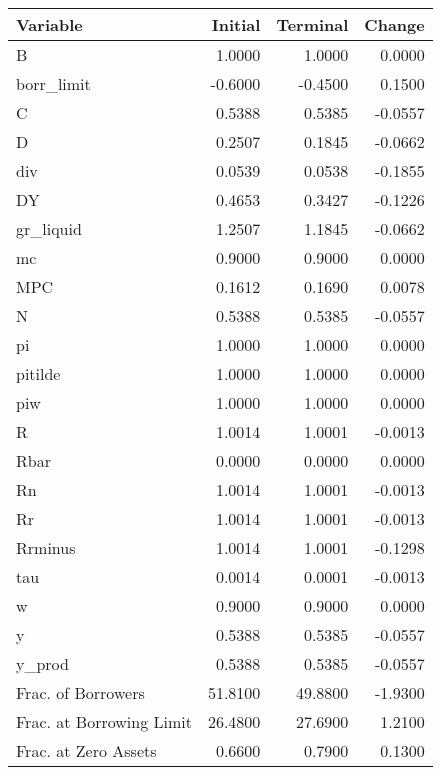 \begin{table}
\centering
\label{tab:stst}
\begin{tabular}{lrrr}
\toprule
                Variable &  Initial &  Terminal &  Change \\
\midrule
                       B &   1.0000 &    1.0000 &  0.0000 \\
              borr\_limit &  -0.6000 &   -0.4500 &  0.1500 \\
                       C &   0.5388 &    0.5385 & -0.0557 \\
                       D &   0.2507 &    0.1845 & -0.0662 \\
                     div &   0.0539 &    0.0538 & -0.1855 \\
                      DY &   0.4653 &    0.3427 & -0.1226 \\
               gr\_liquid &   1.2507 &    1.1845 & -0.0662 \\
                      mc &   0.9000 &    0.9000 &  0.0000 \\
                     MPC &   0.1612 &    0.1690 &  0.0078 \\
                       N &   0.5388 &    0.5385 & -0.0557 \\
                      pi &   1.0000 &    1.0000 &  0.0000 \\
                 pitilde &   1.0000 &    1.0000 &  0.0000 \\
                     piw &   1.0000 &    1.0000 &  0.0000 \\
                       R &   1.0014 &    1.0001 & -0.0013 \\
                    Rbar &   0.0000 &    0.0000 &  0.0000 \\
                      Rn &   1.0014 &    1.0001 & -0.0013 \\
                      Rr &   1.0014 &    1.0001 & -0.0013 \\
                 Rrminus &   1.0014 &    1.0001 & -0.1298 \\
                     tau &   0.0014 &    0.0001 & -0.0013 \\
                       w &   0.9000 &    0.9000 &  0.0000 \\
                       y &   0.5388 &    0.5385 & -0.0557 \\
                  y\_prod &   0.5388 &    0.5385 & -0.0557 \\
      Frac. of Borrowers &  51.8100 &   49.8800 & -1.9300 \\
Frac. at Borrowing Limit &  26.4800 &   27.6900 &  1.2100 \\
    Frac. at Zero Assets &   0.6600 &    0.7900 &  0.1300 \\
\bottomrule
\end{tabular}
\end{table}
